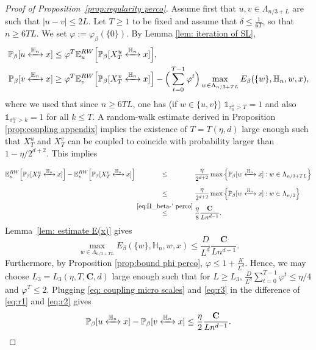\documentclass[11pt,a4paper]{article}
\numberwithin{equation}{section}
\theoremstyle{plain}
\theoremstyle{definition}
\newcommand\bfC{\mathbf{C}}
\newcommand{\connect}{\xleftrightarrow}
\begin{document}
\begin{proof}[Proof of Proposition~\textup{\ref{prop:regularity perco}}]
Assume first that $u,v \in \Lambda_{n/3+L}$ are such that $|u-v|\leq 2L$. Let $T\geq 1$ to be fixed and assume that $\delta\leq \tfrac{1}{6T}$, so that $n\geq 6TL$. We set $\varphi:= \varphi_\beta(\{0\})$. By Lemma \ref{lem: iteration of SL},
\begin{align}
	\mathbb P_\beta[u\connect{\mathbb H_n\:}x]&\leq \varphi^T \mathbb E^{\rm RW}_{u}\Big[\mathbb P_\beta[X_T^u\connect{\mathbb H_n\:}x]\Big], \label{eq:r1}
	\\\mathbb P_\beta[v\connect{\mathbb H_n\:}x]&\geq \varphi^T\mathbb E^{\rm RW}_{v}\Big[\mathbb P_\beta[X_T^v\connect{\mathbb H_n\:}x]\Big]-\Big(\sum_{t=0}^{T-1}\varphi^t\Big)\max_{w\in \Lambda_{n/3+TL}}E_\beta(\{w\},\mathbb H_n,w,x),\label{eq:r2}
\end{align}
where we used that since $n\geq 6TL$, one has (if $w\in \{u,v\}$) $\mathds{1}_{\tau_n^w>T}=1$ and also $\mathds{1}_{\sigma_x^w>k}=1$ for all $k\leq T$.
A random-walk estimate derived in Proposition \ref{prop:coupling appendix}
implies the existence of $T=T(\eta,d)$ large enough such that $X_T^u$ and $X_T^v$ can be coupled to coincide with probability larger than $1-\eta/2^{d+2}$. This implies
\begin{align}
\mathbb E^{\rm RW}_{u}\Big[\mathbb P_\beta[X_T^u\connect{\mathbb H_n\:}x]\Big]-\mathbb E^{\rm RW}_{v}\Big[\mathbb P_\beta[X_T^v\connect{\mathbb H_n\:}x]\Big]&\stackrel{\phantom{\eqref{eq:H_beta-' perco}}}\le \frac{\eta}{2^{d+2}}\max\Big\{\mathbb P_\beta[w\connect{\mathbb H_n\:}x]:w\in \Lambda_{n/3+TL}\Big\}\notag
\\&\stackrel{\phantom{\eqref{eq:H_beta-' perco}}}\leq \frac{\eta}{2^{d+2}}\max\Big\{\mathbb P_\beta[w\connect{\mathbb H_n\:}x]:w\in \Lambda_{n/2}\Big\}\notag
\\&\stackrel{\eqref{eq:H_beta-' perco}}\leq \frac{\eta}{8}\frac{\bfC}{Ln^{d-1}}\label{eq: coupling micro scales} 
.
\end{align}
Lemma~\ref{lem: estimate E(x)} gives
\begin{equation}\label{eq:r3}
	\max_{w\in \Lambda_{n/3+TL}}E_\beta(\{w\},\mathbb H_n,w,x)\leq \frac{D}{L^{d}}\frac{\bfC}{Ln^{d-1}}.
\end{equation}
Furthermore, by Proposition \ref{prop:bound phi perco}, $\varphi\le 1+\tfrac{K}{L^d}$. Hence, we may choose $L_3=L_3(\eta,T,\bfC,d)$ large enough such that for $L\geq L_3$, $\frac{D}{L^{d}}\sum_{t=0}^{T-1}\varphi^t\le \eta/4$ and $\varphi^T\leq 2$. Plugging \eqref{eq: coupling micro scales} and \eqref{eq:r3} in the difference of \eqref{eq:r1} and \eqref{eq:r2} gives
\begin{equation}\label{eq:proofregclose}
	\mathbb P_\beta[u\connect{\mathbb H_n\:}x]-\mathbb P_\beta[v\connect{\mathbb H_n\:}x]\leq \frac{\eta}{2}\frac{\bfC}{Ln^{d-1}}.
\end{equation}


\end{proof}
\end{document}
